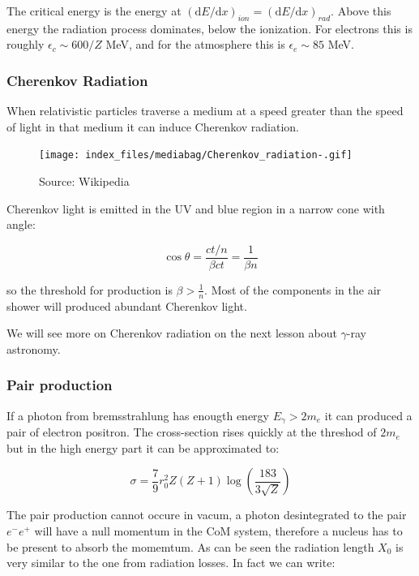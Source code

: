 \documentclass[
  letterpaper,
  DIV=11,
  numbers=noendperiod]{scrreprt}
\begin{document}
The critical energy is the energy at
\((\mathrm{ d}E/\mathrm{ d}x)_{ion} = (\mathrm{ d}E/\mathrm{ d}x)_{rad}\).
Above this energy the radiation process dominates, below the ionization.
For electrons this is roughly \(\epsilon_c \sim 600/Z\) MeV, and for the
atmosphere this is \(\epsilon_e \sim 85\) MeV.

\subsubsection*{Cherenkov Radiation}\label{cherenkov-radiation}

When relativistic particles traverse a medium at a speed greater than
the speed of light in that medium it can induce Cherenkov radiation.

\begin{figure}[H]

{\centering \texttt{[image: index\_files/mediabag/Cherenkov\_radiation-.gif]}

}

\caption{Source: Wikipedia}

\end{figure}%

Cherenkov light is emitted in the UV and blue region in a narrow cone
with angle:

\[\cos \theta = \frac{ct/n}{\beta c t} = \frac{1}{\beta n}\]

so the threshold for production is \(\beta > \frac{1}{n}\). Most of the
components in the air shower will produced abundant Cherenkov light.

We will see more on Cherenkov radiation on the next lesson about
\(\gamma\)-ray astronomy.

\subsubsection*{Pair production}\label{pair-production}

If a photon from bremsstrahlung has enougth energy \(E_\gamma > 2 m_e\)
it can produced a pair of electron positron. The cross-section rises
quickly at the threshod of \(2 m_e\) but in the high energy part it can
be approximated to:

\[\sigma = \frac{7}{9} r_0^2 Z (Z+ 1)\log \left(\frac{183}{3\sqrt{Z}}\right)\]

The pair production cannot occure in vacum, a photon desintegrated to
the pair \(e^-e^+\) will have a null momentum in the CoM system,
therefore a nucleus has to be present to absorb the momemtum. As can be
seen the radiation length \(X_0\) is very similar to the one from
radiation losses. In fact we can write:
\end{document}

